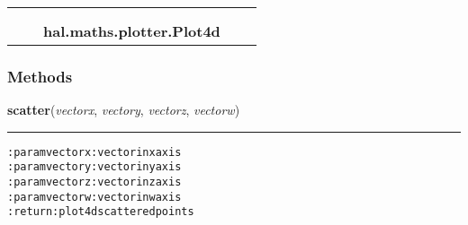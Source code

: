     \label{hal:maths:plotter:Plot4d}
\begin{tabular}{cccccc}
\multicolumn{2}{r}{\settowidth{\BCL}{object}\multirow{2}{\BCL}{object}}
&&
  \\\cline{3-3}
  &&\multicolumn{1}{c|}{}
&&
  \\
&&\multicolumn{2}{l}{\textbf{hal.maths.plotter.Plot4d}}
\end{tabular}



  \subsubsection{Methods}

    \label{hal:maths:plotter:Plot4d:scatter}

    \vspace{0.5ex}

\hspace{.8\funcindent}\begin{boxedminipage}{\funcwidth}

    \raggedright \textbf{scatter}(\textit{vectorx}, \textit{vectory}, \textit{vectorz}, \textit{vectorw})

    \vspace{-1.5ex}

    \rule{\textwidth}{0.5\fboxrule}
\setlength{\parskip}{2ex}
\begin{alltt}

:param vectorx: vector in x axis
:param vectory: vector in y axis
:param vectorz: vector in z axis
:param vectorw: vector in w axis
:return: plot 4d scattered points
\end{alltt}

\setlength{\parskip}{1ex}
    \end{boxedminipage}

    \label{hal:maths:plotter:Plot4d:param}

